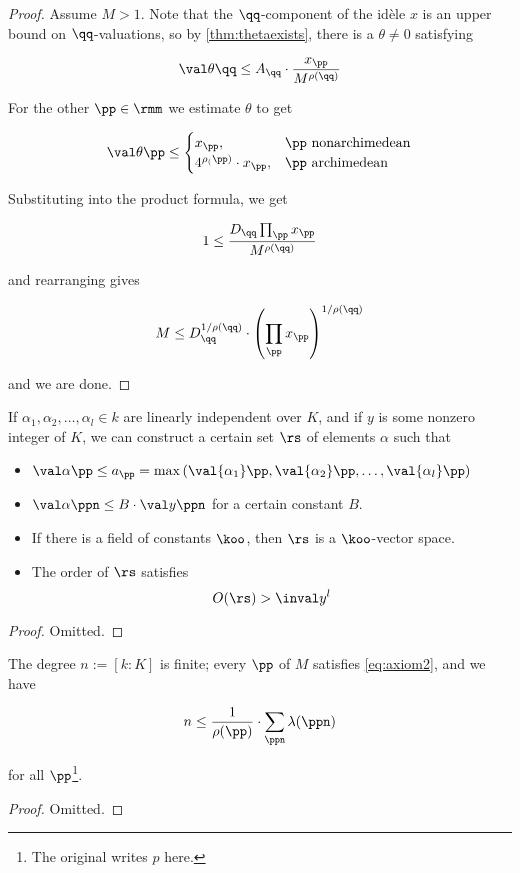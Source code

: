 \begin{proof}
  Assume $M>1$. Note that the $\qq$-component of the id\`ele $x$ is an upper
  bound on $\qq$-valuations, so by \ref{thm:thetaexists}, there is a $\theta\neq
  0$ satisfying

  \[ \val\theta\qq \leq A_\qq \cdot \frac {x_\pp}{M^{\rho(\qq)}} \]

  For the other $\pp\in\rmm$ we estimate $\theta$ to get

  \[
    \val\theta\pp \leq
    \begin{cases}
      x_\pp, &\pp \text{ nonarchimedean}\\
      4^{\rho_(\pp)}\cdot x_\pp, &\pp \text{ archimedean}
    \end{cases}
  \]

  Substituting into the product formula, we get

  \[ 1\leq \frac{D_\qq \prod_\pp x_\pp}{M^{\rho(\qq)}} \]

  and rearranging gives

  \[ M \leq { D_\qq^{1/\rho(\qq)} } \cdot {\left( \prod_\pp x_\pp \right)}^{1/\rho(\qq)} \]

  and we are done.

\end{proof}

\begin{lemma}
  If $\alpha_1,\alpha_2,\ldots,\alpha_l\in k$ are linearly independent over $K$,
  and if $y$ is some nonzero integer of $K$, we can construct a certain set $\rs$
  of elements $\alpha$ such that

  \begin{itemize}
  \item $\val\alpha\pp\leq a_\pp = \max\left( \val{\alpha_1}\pp,\val{\alpha_2}\pp,\ldots,\val{\alpha_l}\pp\right)$
  \item $\val\alpha\ppn \leq B\cdot\val y\ppn$ for a certain constant $B$.
  \item If there is a field of constants $\koo$, then $\rs$ is a $\koo$-vector space.
  \item The order of $\rs$ satisfies
    \[ O({\rs}) > \inval y ^l \]
  \end{itemize}
\end{lemma}
\begin{proof}
  Omitted.
\end{proof}

\begin{lemma}
  The degree $n := [k:K]$ is finite; every $\pp$ of $M$ satisfies
  \ref{eq:axiom2}, and we have

  \[ n \leq \frac1{\rho(\pp)} \cdot \sum_{\ppn}\lambda(\ppn) \]

  for all $\pp$\footnote{The original writes $p$ here.}.
\end{lemma}
\begin{proof}
  Omitted.
\end{proof}

